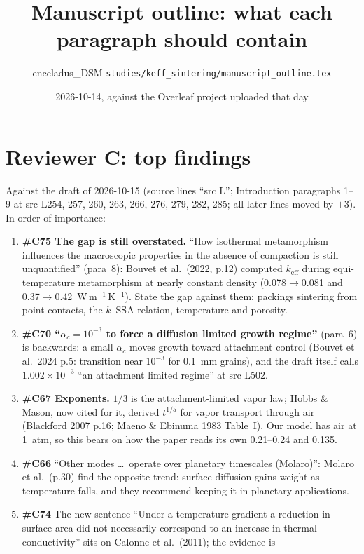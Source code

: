 \documentclass[11pt]{article}
\title{Manuscript outline: what each paragraph should contain}
\author{enceladus\_DSM \quad \texttt{studies/keff\_sintering/manuscript\_outline.tex}}
\date{2026-10-14, against the Overleaf project uploaded that day}
\newcommand{\add}[1]{\textcolor{revX}{#1}}
\begin{document}
\maketitle

\section*{\add{Reviewer C: top findings}}
\add{Against the draft of 2026-10-15 (source lines ``src L''; Introduction
paragraphs 1--9 at src L254, 257, 260, 263, 266, 276, 279, 282, 285; all later
lines moved by $+3$). In order of importance:}
\begin{enumerate}
\item \add{\textbf{\#C75 The gap is still overstated.} ``How isothermal
  metamorphism influences the macroscopic properties in the absence of
  compaction is still unquantified'' (para~8): Bouvet et al.\ (2022, p.12)
  computed $k_{\mathrm{eff}}$ during equi-temperature metamorphism at nearly
  constant density (0.078$\to$0.081 and 0.37$\to$0.42~W\,m$^{-1}$\,K$^{-1}$).
  State the gap against them: packings sintering from point contacts, the
  $k$--SSA relation, temperature and porosity.}
\item \add{\textbf{\#C70 ``$\alpha_c = 10^{-3}$ to force a diffusion limited
  growth regime''} (para~6) is backwards: a small $\alpha_c$ moves growth
  toward attachment control (Bouvet et al.\ 2024 p.5: transition near
  $10^{-3}$ for 0.1~mm grains), and the draft itself calls $1.002\times10^{-3}$
  ``an attachment limited regime'' at src L502.}
\item \add{\textbf{\#C67 Exponents.} $1/3$ is the attachment-limited vapor
  law; Hobbs \& Mason, now cited for it, derived $t^{1/5}$ for vapor
  transport through air (Blackford 2007 p.16; Maeno \& Ebinuma 1983 Table~I).
  Our model has air at 1~atm, so this bears on how the paper reads its own
  0.21--0.24 and 0.135.}
\item \add{\textbf{\#C66} ``Other modes \ldots\ operate over planetary
  timescales (Molaro)'': Molaro et al.\ (p.30) find the opposite trend:
  surface diffusion gains weight as temperature falls, and they recommend
  keeping it in planetary applications.}
\item \add{\textbf{\#C74} The new sentence ``Under a temperature gradient a
  reduction in surface area did not necessarily correspond to an increase in
  thermal conductivity'' sits on Calonne et al.\ (2011); the evidence is
}
\end{enumerate}
\end{document}
